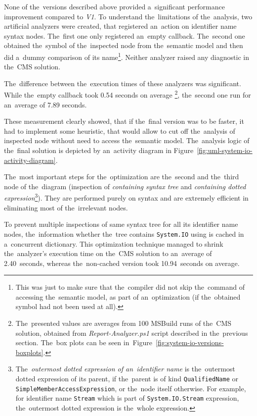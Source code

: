 \documentclass[
  digital, %
  table,   %
  lof,     %
  lot,     %
  oneside,
]{fithesis3}
\begin{document}
None of the~versions described above provided a~significant performance improvement compared to \textit{V1}. To understand the~limitations of the~analysis, two artificial analyzers were created, that registered an~action on identifier name syntax nodes. The~first one only registered an~empty callback. The~second one obtained the~symbol of the~inspected node from the~semantic model and then did a~dummy comparison of its name\footnote{This was just to make sure that the~compiler did not skip the~command of accessing the~semantic model, as part of an~optimization (if the~obtained symbol had not been used at all).}. Neither analyzer raised any diagnostic in the~CMS solution. 

The~difference between the~execution times of these analyzers was significant. While the~empty callback took 0.54 seconds on average \footnote{The~presented values are averages from 100 MSBuild runs of the~CMS solution, obtained from \textit{Report-Analyzer.ps1} script described in the~previous section. The~box plots can be seen in~Figure~\ref{fig:system-io-versions-boxplots}.}, the~second one run for an~average of 7.89 seconds. 

These measurement clearly showed, that if the~final version was to be faster, it had to implement some heuristic, that would allow to cut off the~analysis of inspected node without need to access the~semantic model. The~analysis logic of the~final solution is depicted by an~activity diagram in Figure~\ref{fig:uml-system-io-activity-diagram}. 

The~most important steps for the~optimization are the~second and the~third node of the~diagram (inspection of \textit{containing syntax tree} and \textit{containing dotted expression}\footnote{The~\textit{outermost dotted expression of an~identifier name} is the~outermost dotted expression of its parent, if the~parent is of kind \texttt{QualifiedName} or \texttt{SimpleMemberAccessExpression}, or the~node itself otherwise. For example, for identifier name \texttt{Stream} which is part of \texttt{System.IO.Stream} expression, the~outermost dotted expression is the~whole expression.}). They are performed purely on syntax and are extremely efficient in eliminating most of the~irrelevant nodes. 

To prevent multiple inspections of same syntax tree for all its identifier name nodes, the~information whether the~tree contains \texttt{System.IO} using is cached in a~concurrent dictionary. This optimization technique managed to shrink the~analyzer's execution time on the~CMS solution to an~average of 2.40~seconds, whereas the~non-cached version took 10.94~seconds on average. 
\end{document}

